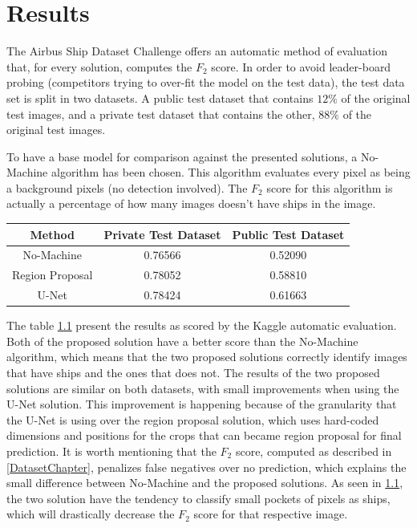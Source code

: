 \chapter{Results}

The Airbus Ship Dataset Challenge \cite{AirbusDataSetChallenge} offers an automatic method of evaluation that, for every solution, computes the $F_2$ score. In order to avoid leader-board probing (competitors trying to over-fit the model on the test data), the test data set is split in two datasets. A public test dataset that contains $12\%$ of the original test images, and a private test dataset that contains the other, $88\%$ of the original test images.

To have a base model for comparison against the presented solutions, a No-Machine algorithm has been chosen. This algorithm evaluates every pixel as being a background pixels (no detection involved). The $F_2$ score for this algorithm is actually a percentage of how many images doesn't have ships in the image.

\begin{table}[h]
	\centering
	\begin{tabular}{|c|c|c|}
		\hline
		Method & Private Test Dataset & Public Test Dataset \\ \hline
		No-Machine & 0.76566	& 0.52090  \\ \hline
		Region Proposal & 0.78052	& 0.58810 \\ \hline
		U-Net & 0.78424	& 0.61663  \\ \hline
	\end{tabular}
	\label{resultOnComp}
\end{table}

The table \ref{resultOnComp} present the results as scored by the Kaggle automatic evaluation. Both of the proposed solution have a better score than the No-Machine algorithm, which means that the two proposed solutions correctly identify images that have ships and the ones that does not. The results of the two proposed solutions are similar on both datasets, with small improvements when using the U-Net solution. This improvement is happening because of the granularity that the U-Net is using over the region proposal solution, which uses hard-coded dimensions and positions for the crops that can became region proposal for final prediction. It is worth mentioning that the $F_2$ score, computed as described in \ref{DatasetChapter}, penalizes false negatives over no prediction, which explains the small difference between No-Machine and the proposed solutions. As seen in \ref{resultOnComp}, the two solution have the tendency to classify small pockets of pixels as ships, which will drastically decrease the $F_2$ score for that respective image.

